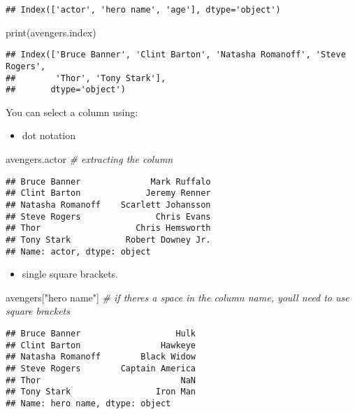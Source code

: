 \documentclass[
]{book}
\newenvironment{Shaded}{\begin{snugshade}}{\end{snugshade}}
\newcommand{\BuiltInTok}[1]{#1}
\newcommand{\CommentTok}[1]{\textcolor[rgb]{0.56,0.35,0.01}{\textit{#1}}}
\newcommand{\NormalTok}[1]{#1}
\newcommand{\StringTok}[1]{\textcolor[rgb]{0.31,0.60,0.02}{#1}}
\providecommand{\tightlist}{%
  \setlength{\itemsep}{0pt}\setlength{\parskip}{0pt}}
\begin{document}
\begin{verbatim}
## Index(['actor', 'hero name', 'age'], dtype='object')
\end{verbatim}

\begin{Shaded}
\begin{Highlighting}[]
\BuiltInTok{print}\NormalTok{(avengers.index)}
\end{Highlighting}
\end{Shaded}

\begin{verbatim}
## Index(['Bruce Banner', 'Clint Barton', 'Natasha Romanoff', 'Steve Rogers',
##        'Thor', 'Tony Stark'],
##       dtype='object')
\end{verbatim}

You can select a column using:

\begin{itemize}
\tightlist
\item
  dot notation
\end{itemize}

\begin{Shaded}
\begin{Highlighting}[]
\NormalTok{avengers.actor }\CommentTok{\# extracting the column}
\end{Highlighting}
\end{Shaded}

\begin{verbatim}
## Bruce Banner              Mark Ruffalo
## Clint Barton             Jeremy Renner
## Natasha Romanoff    Scarlett Johansson
## Steve Rogers               Chris Evans
## Thor                   Chris Hemsworth
## Tony Stark           Robert Downey Jr.
## Name: actor, dtype: object
\end{verbatim}

\begin{itemize}
\tightlist
\item
  single square brackets.
\end{itemize}

\begin{Shaded}
\begin{Highlighting}[]
\NormalTok{avengers[}\StringTok{"hero name"}\NormalTok{] }\CommentTok{\# if there\textquotesingle{}s a space in the column name, you\textquotesingle{}ll need to use square brackets}
\end{Highlighting}
\end{Shaded}

\begin{verbatim}
## Bruce Banner                   Hulk
## Clint Barton                Hawkeye
## Natasha Romanoff        Black Widow
## Steve Rogers        Captain America
## Thor                            NaN
## Tony Stark                 Iron Man
## Name: hero name, dtype: object
\end{verbatim}
\end{document}

